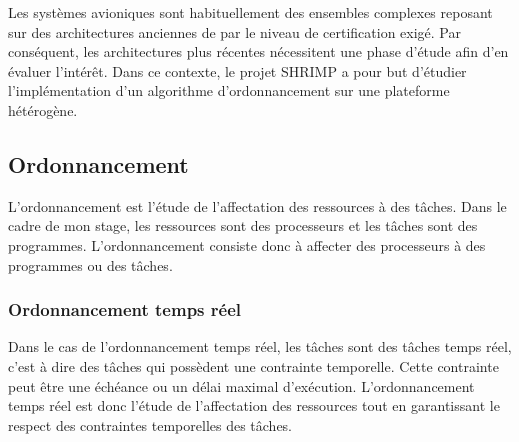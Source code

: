 

Les systèmes avioniques sont habituellement des ensembles complexes reposant sur des architectures anciennes de par le niveau de certification exigé. Par conséquent, les architectures plus récentes nécessitent une phase d'étude afin d'en évaluer l'intérêt. Dans ce contexte, le projet SHRIMP a pour but d'étudier l'implémentation d'un algorithme d'ordonnancement sur une plateforme hétérogène.   

\subsection{Ordonnancement}

L'ordonnancement est l'étude de l'affectation des ressources à des tâches. Dans le cadre de mon stage, les ressources sont des processeurs et les tâches sont des programmes. L'ordonnancement consiste donc à affecter des processeurs à des programmes ou des tâches.


\subsubsection{Ordonnancement temps réel}
Dans le cas de l'ordonnancement temps réel, les tâches sont des tâches temps réel, c'est à dire des tâches qui possèdent une contrainte temporelle. Cette contrainte peut être une échéance ou un délai maximal d'exécution. L'ordonnancement temps réel est donc l'étude de l'affectation des ressources tout en garantissant le respect des contraintes temporelles des tâches. 

